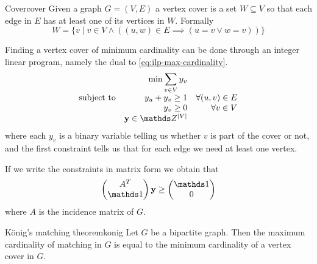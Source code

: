 \documentclass[12pt]{extarticle}
\renewcommand{\vec}[1]{\bvec{#1}}
\begin{document}
\begin{definition}{Cover}{cover}
	Given a graph $G = (V, E)$ a vertex cover is a set $W \subseteq V$ so that each edge in
	$E$ has at least one of its vertices in $W$. Formally
	\begin{equation}
		W = \{ v \mid v \in V \land ((u, w) \in E \implies (u = v \lor w = v)) \}
	\end{equation}
\end{definition}

Finding a vertex cover of minimum cardinality can be done through an integer linear program, namely
the dual to \cref{eq:ilp-max-cardinality}.
\begin{equation}
	\begin{array}{lrr}
		                  & \displaystyle \min \sum_{v \in V} y_v &                      \\
		\text{subject to} & y_u + y_v \geq 1                      & \forall (u, v) \in E \\
		                  & y_v \geq 0                            & \forall v \in V      \\
		                  & \vec y \in \Z^{\abs{V}}               &
	\end{array}
\end{equation}
where each $y_v$ is a binary variable telling us whether $v$ is part of the cover or not, and the
first constraint tells us that for each edge we need at least one vertex.

If we write the constraints in matrix form we obtain that
\begin{equation}
	\begin{pmatrix} A^T \\ \mathds 1 \end{pmatrix} \vec y \geq
	\begin{pmatrix} \mathds 1 \\ 0 \end{pmatrix}
\end{equation}
where $A$ is the incidence matrix of $G$.

\begin{theorem}{König's matching theorem}{konig}
	Let $G$ be a bipartite graph. Then the maximum cardinality of matching in $G$ is equal to the
	minimum cardinality of a vertex cover in $G$.
\end{theorem}
\end{document}
